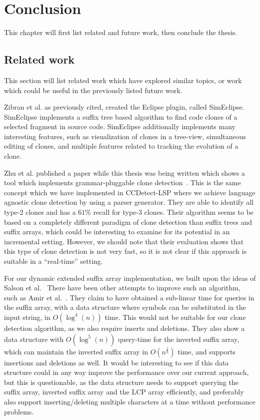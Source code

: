 \chapter{Conclusion}

This chapter will first list related and future work, then conclude the thesis.

\section{Related work}

This section will list related work which have explored similar topics, or work which
could be useful in the previously listed future work.

Zibran et al. as previously cited, created the Eclipse plugin, called
SimEclipse\cite{Udding_Towards_Convenient_Management}. SimEclipse implements a suffix tree
based algorithm to find code clones of a selected fragment in source
code\cite{Zibran_real_time_search}. SimEclipse additionally implements many interesting
features, such as visualization of clones in a tree-view, simultaneous editing of clones,
and multiple features related to tracking the evolution of a clone.

Zhu et al. published a paper while this thesis was being written which shows a tool which
implements grammar-pluggable clone detection~\cite{GrammarPluggableCloneDetection}. This
is the same concept which we have implemented in CCDetect-LSP where we achieve language
agnostic clone detection by using a parser generator. They are able to identify all type-2
clones and has a $61\%$ recall for type-3 clones. Their algorithm seems to be based on a
completely different paradigm of clone detection than suffix trees and suffix arrays,
which could be interesting to examine for its potential in an incremental setting.
However, we should note that their evaluation shows that this type of clone detection is
not very fast, so it is not clear if this approach is suitable in a ``real-time'' setting.

For our dynamic extended suffix array implementation, we built upon the ideas of Salson et
al.~\cite{DynamicExtendedSuffixArrays, DynamicExtendedSuffixArraysReorderings, DynamicBWT}
There have been other attempts to improve such an algorithm, such as Amir et
al.~\cite{AmirDynamicSuffixWithPoly}. They claim to have obtained a sub-linear time for
queries in the suffix array, with a data structure where symbols can be substituted in the
input string, in $O(\log^4(n))$ time. This would not be suitable for our clone detection
algorithm, as we also require inserts and deletions. They also show a data structure with
$O(\log^5(n))$ query-time for the inverted suffix array, which can maintain the inverted
suffix array in $O(n^{\frac{2}{3}})$ time, and supports insertions and deletions as well.
It would be interesting to see if this data structure could in any way improve the
performance over our current approach, but this is questionable, as the data structure
needs to support querying the suffix array, inverted suffix array and the LCP array
efficiently, and preferably also support inserting/deleting multiple characters at a time
without performance problems.

